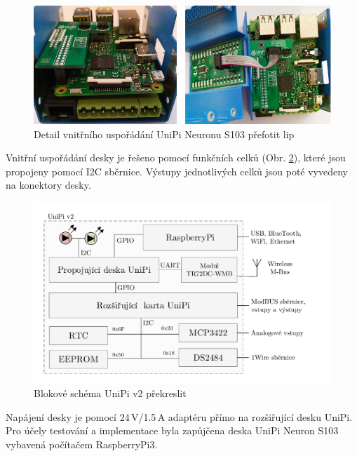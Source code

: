  \begin{figure}[!h]
  \begin{center}
    \includegraphics[scale=0.65]{obrazky/unipi_propojuvnitr}
  \end{center}
	\label{PicureUniPi2}
  \caption{Detail vnitřního uspořádání UniPi Neuronu S103 \colorbox[rgb]{0,1,0}{přefotit lip}}
\end{figure}

Vnitřní uspořádání desky je řešeno pomocí funkčních celků (Obr. \ref{BlokSchema2}), které jsou propojeny pomocí I2C sběrnice. Výstupy jednotlivých celků jsou poté vyvedeny na konektory desky.
 \begin{figure}[!h]
  \begin{center}
    \includegraphics[scale=0.55]{obrazky/unipi_schema2}
  \end{center}
	\label{BlokSchema2}
  \caption{Blokové schéma UniPi v2 \colorbox[rgb]{0,1,0}{překreslit}}
\end{figure}



Napájení desky je pomocí 24\,V/1.5\,A adaptéru přímo na rozšiřující desku UniPi. Pro účely testování a implementace byla zapůjčena deska UniPi Neuron S103 vybavená počítačem RaspberryPi3.

